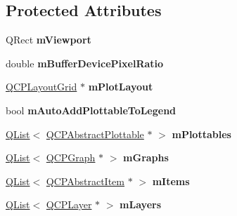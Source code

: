 \subsection*{Protected Attributes}
\begin{DoxyCompactItemize}
\item 
Q\+Rect {\bfseries m\+Viewport}\hypertarget{class_q_custom_plot_ac0a7c38a715526c257cff95774f83ab6}{}\label{class_q_custom_plot_ac0a7c38a715526c257cff95774f83ab6}

\item 
double {\bfseries m\+Buffer\+Device\+Pixel\+Ratio}\hypertarget{class_q_custom_plot_a63a40c57a2d89eea27b90b62cc4eee1f}{}\label{class_q_custom_plot_a63a40c57a2d89eea27b90b62cc4eee1f}

\item 
\hyperlink{class_q_c_p_layout_grid}{Q\+C\+P\+Layout\+Grid} $\ast$ {\bfseries m\+Plot\+Layout}\hypertarget{class_q_custom_plot_abbc71e86f5fbc20f50ca3dad2dec663c}{}\label{class_q_custom_plot_abbc71e86f5fbc20f50ca3dad2dec663c}

\item 
bool {\bfseries m\+Auto\+Add\+Plottable\+To\+Legend}\hypertarget{class_q_custom_plot_aaf3ea6a4cb04d35a149cc9a0cdac3394}{}\label{class_q_custom_plot_aaf3ea6a4cb04d35a149cc9a0cdac3394}

\item 
\hyperlink{class_q_list}{Q\+List}$<$ \hyperlink{class_q_c_p_abstract_plottable}{Q\+C\+P\+Abstract\+Plottable} $\ast$ $>$ {\bfseries m\+Plottables}\hypertarget{class_q_custom_plot_aac9fd7449c91296cce8fa6bd03258f09}{}\label{class_q_custom_plot_aac9fd7449c91296cce8fa6bd03258f09}

\item 
\hyperlink{class_q_list}{Q\+List}$<$ \hyperlink{class_q_c_p_graph}{Q\+C\+P\+Graph} $\ast$ $>$ {\bfseries m\+Graphs}\hypertarget{class_q_custom_plot_a125bf0974402c5ddc088fcd86988225c}{}\label{class_q_custom_plot_a125bf0974402c5ddc088fcd86988225c}

\item 
\hyperlink{class_q_list}{Q\+List}$<$ \hyperlink{class_q_c_p_abstract_item}{Q\+C\+P\+Abstract\+Item} $\ast$ $>$ {\bfseries m\+Items}\hypertarget{class_q_custom_plot_a778eaf240b1fef42060fad1775300182}{}\label{class_q_custom_plot_a778eaf240b1fef42060fad1775300182}

\item 
\hyperlink{class_q_list}{Q\+List}$<$ \hyperlink{class_q_c_p_layer}{Q\+C\+P\+Layer} $\ast$ $>$ {\bfseries m\+Layers}\hypertarget{class_q_custom_plot_ad02f64f4164a002ea1fc055a85bb14e6}{}\label{class_q_custom_plot_ad02f64f4164a002ea1fc055a85bb14e6}


\end{DoxyCompactItemize}
